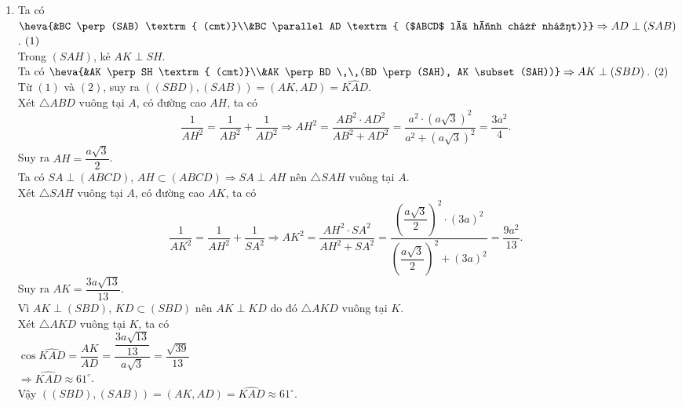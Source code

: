 \begin{ex}
{\begin{enumerate}
		\item Ta có $\heva{&BC \perp (SAB) \textrm{ (cmt)}\\&BC \parallel AD \textrm{  ($ABCD$ là hình chữ nhật)}} \Rightarrow AD \perp (SAB)$. $\hfill (1)$\\
		Trong $(SAH)$, kẻ $AK \perp  SH$.\\
		Ta có $\heva{&AK \perp SH \textrm{ (cmt)}\\&AK \perp BD \,\,(BD \perp (SAH),  AK \subset (SAH))} \Rightarrow AK \perp (SBD)$. $\hfill (2)$\\
		Từ $(1)$ và $(2)$, suy ra $\left((SBD),(SAB)\right)  = \left(AK, AD\right) = \widehat{KAD}$.\\
		Xét $\triangle ABD$ vuông tại $A$, có  đường cao $AH$, ta có
		$$ \dfrac{1}{AH^2} = \dfrac{1}{AB^2} + \dfrac{1}{AD^2} \Rightarrow AH^2 = \dfrac{AB^2\cdot AD^2}{AB^2 + AD^2} = \dfrac{a^2\cdot (a\sqrt{3})^2}{a^2 + (a\sqrt{3})^2} =  \dfrac{3a^2}{4}. $$
		Suy ra $AH = \dfrac{a\sqrt{3}}{2}$.\\ 
		Ta có $SA \perp (ABCD)$, $AH \subset (ABCD) \Rightarrow SA  \perp AH$ nên $\triangle SAH$ vuông tại $A$.\\
		Xét $\triangle SAH$  vuông tại $A$, có đường cao $AK$, ta có
		$$ \dfrac{1}{AK^2} = \dfrac{1}{AH^2} + \dfrac{1}{SA^2} \Rightarrow AK^2 = \dfrac{AH^2\cdot SA^2}{AH^2 + SA^2}  = \dfrac{\left(\dfrac{a\sqrt{3}}{2}\right)^2\cdot (3a)^2}{\left(\dfrac{a\sqrt{3}}{2}\right)^2 + (3a)^2} = \dfrac{9a^2}{13}. $$
		 Suy ra $AK = \dfrac{3a\sqrt{13}}{13}$.\\
		Vì $AK \perp (SBD)$, $KD \subset (SBD)$ nên $AK \perp  KD$ do đó $\triangle AKD$ vuông tại $K$.\\
		Xét  $\triangle AKD$ vuông tại $K$, ta có\\
		$\cos\widehat{KAD} = \dfrac{AK}{AD} = \dfrac{\dfrac{3a\sqrt{13}}{13}}{a\sqrt{3}} =  \dfrac{\sqrt{39}}{13}$\\
		 $\Rightarrow \widehat{KAD} \approx 61^\circ$.\\
		Vậy $\left((SBD),(SAB)\right) = \left(AK, AD\right) =  \widehat{KAD} \approx 61^\circ$.
	\end{enumerate}
} 
\end{ex}

